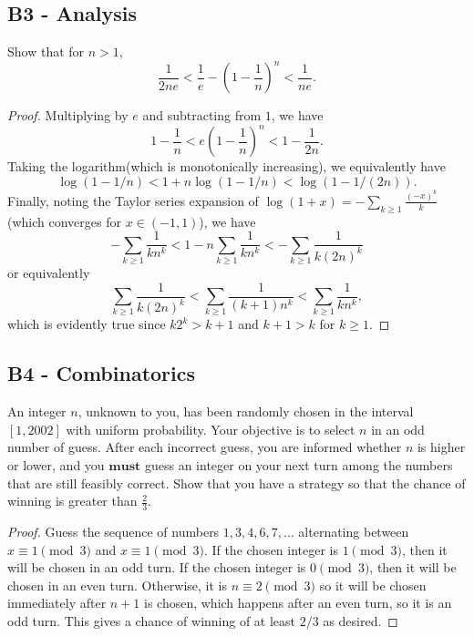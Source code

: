 \documentclass[11pt]{scrartcl}
\newcommand{\<}{\langle}
\renewcommand{\>}{\rangle}
\begin{document}
\pagebreak
\subsection{B3 - Analysis}
Show that for $n > 1$,
$$\frac{1}{2ne} < \frac{1}{e} - \left( 1 - \frac{1}{n} \right)^n < \frac{1}{ne}. $$
\begin{proof}
Multiplying by $e$ and subtracting from $1$, we have 
$$1 - \frac{1}{n} < e \left(1 - \frac{1}{n}\right)^n < 1 - \frac{1}{2n}.$$
Taking the logarithm(which is monotonically increasing), we equivalently have
$$\log(1 - 1/n) < 1 + n\log(1 - 1/n) < \log(1- 1/(2n)).$$
Finally, noting the Taylor series expansion of $\log(1 + x) = -\sum_{k \ge 1} \frac{(-x)^k}{k}$(which converges for $x \in (-1, 1)$), we have
$$-\sum_{k \ge 1} \frac{1}{kn^k}< 1 - n\sum_{k \ge 1} \frac{1}{kn^k} < -\sum_{k \ge 1} \frac{1}{k(2n)^k}$$
or equivalently
$$\sum_{k\ge 1}\frac{1}{k(2n)^k} < \sum_{k \ge 1} \frac{1}{(k + 1)n^k} <\sum_{k \ge 1} \frac{1}{kn^k},$$
which is evidently true since $k2^k > k + 1$ and $k+1 > k$ for $k \ge 1$.
\end{proof}
\pagebreak
\subsection{B4 - Combinatorics}
An integer $n$, unknown to you, has been randomly chosen in the interval $[1,2002]$ with uniform probability. Your objective is to select $n$ in an odd number of guess. After each incorrect guess, you are informed whether $n$ is higher or lower, and you $\textbf{must}$ guess an integer on your next turn among the numbers that are still feasibly correct. Show that you have a strategy so that the chance of winning is greater than $\tfrac{2}{3}$.

\begin{proof}
Guess the sequence of numbers $1, 3, 4, 6, 7, \dots$ alternating between $x \equiv 1 \pmod{3}$ and $x \equiv 1 \pmod{3}$.  If the chosen integer is  $1 \pmod{3}$, then it will be chosen in an odd turn.  If the chosen integer is $0 \pmod{3}$, then it will be chosen in an even turn.  Otherwise, it is $n \equiv 2 \pmod{3}$ so it will be chosen immediately after $n+1$ is chosen, which happens after an even turn, so it is an odd turn.  This gives a chance of winning of at least $2/3$ as desired.  
\end{proof}
\pagebreak
\end{document}
